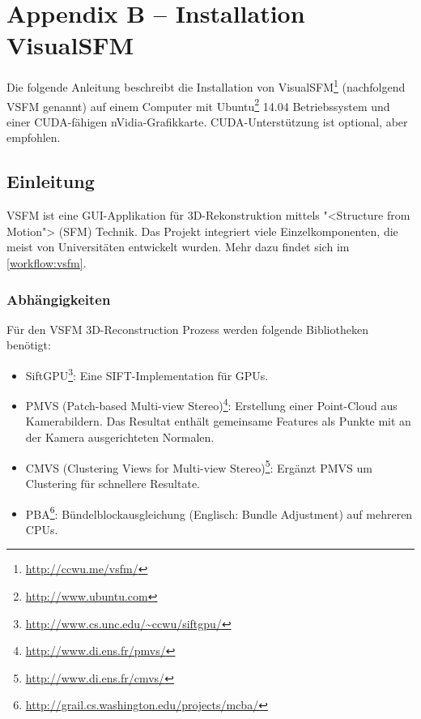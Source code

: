 \chapter{Appendix B -- Installation VisualSFM}

\label{ch:installing-vsfm}


Die folgende Anleitung beschreibt die Installation von
VisualSFM\footnote{\url{http://ccwu.me/vsfm/}} (nachfolgend VSFM genannt) auf
einem Computer mit Ubuntu\footnote{\url{http://www.ubuntu.com}} 14.04
Betriebssystem und einer CUDA-fähigen nVidia-Grafikkarte. CUDA-Unterstützung ist
optional, aber empfohlen.


\section{Einleitung}

VSFM ist eine GUI-Applikation für 3D-Rekonstruktion mittels "<Structure from
Motion"> (SFM) Technik. Das Projekt integriert viele Einzelkomponenten, die
meist von Universitäten entwickelt wurden. Mehr dazu findet sich im
\autoref{workflow:vsfm}.

\subsection{Abhängigkeiten}

Für den VSFM 3D-Reconstruction Prozess werden folgende Bibliotheken benötigt:

\begin{itemize}
	\item SiftGPU\footnote{\url{http://www.cs.unc.edu/~ccwu/siftgpu/}}:
		Eine SIFT\cite{lowe:2004}-Implementation für GPUs.
	\item PMVS (Patch-based Multi-view Stereo)\footnote{\url{http://www.di.ens.fr/pmvs/}}:
		Erstellung einer Point-Cloud aus Kamerabildern.
		Das Resultat enthält gemeinsame Features als
		Punkte mit an der Kamera ausgerichteten Normalen.
	\item CMVS (Clustering Views for Multi-view Stereo)\footnote{\url{http://www.di.ens.fr/cmvs/}}:
		Ergänzt PMVS um Clustering für schnellere Resultate.
	\item PBA\footnote{\url{http://grail.cs.washington.edu/projects/mcba/}}:
		Bündelblockausgleichung (Englisch: Bundle Adjustment) auf mehreren CPUs.
\end{itemize}


